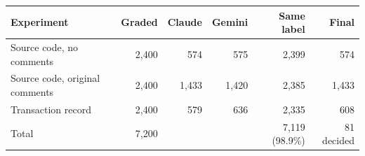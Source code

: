 \begin{tabular}{lrrrrr}
\toprule
Experiment & Graded & Claude & Gemini & Same label & Final \\
\midrule
Source code, no comments & 2,400 & 574 & 575 & 2,399 & 574 \\
Source code, original comments & 2,400 & 1,433 & 1,420 & 2,385 & 1,433 \\
Transaction record & 2,400 & 579 & 636 & 2,335 & 608 \\
\midrule
Total & 7,200 & & & 7,119 (98.9\%) & 81 decided \\
\bottomrule
\end{tabular}
